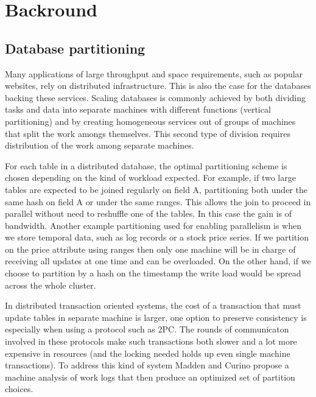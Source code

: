 \chapter{Backround}
\label{chap:background}
\section{Database partitioning}
Many applications of large throughput and space requirements, such as popular websites, rely on distributed infrastructure. This is also the case for the databases backing these services. Scaling databases is commonly achieved by both dividing tasks and data into separate machines  with different functions (vertical partitioning) and by creating homogeneous services out of groups of machines that split the work amongs themselves.  This second type of division requires distribution of the work among separate machines.

For each table in a distributed database, the optimal partitioning scheme is chosen depending on the kind of workload expected. For example, if two large tables are expected to be joined regularly on field A, partitioning both under the same hash on field A or under the same ranges. This allows the join to proceed in parallel without need to reshuffle one of the tables. In this case the gain is of bandwidth.  Another example partitioning used for enabling parallelism is when we store temporal data, such as log records or a stock price series. If we partition on the price attribute using ranges then only one machine will be in charge of receiving all updates at one time and can be overloaded.  On the other hand, if we choose to partition by a hash on the timestamp the write load would be spread across the whole cluster.

In distributed transaction oriented systems, the cost of a transaction that must update tables in separate machine is larger, one option to preserve consistency is especially when using a protocol such as 2PC.  The rounds of communicaton involved in these protocols make such transactions both slower and a lot more expensive in resources (and the locking needed holds up even single machine transactions).  To address this kind of system Madden and Curino propose a machine analysis of work logs that then produce an optimized set of partition choices. 

